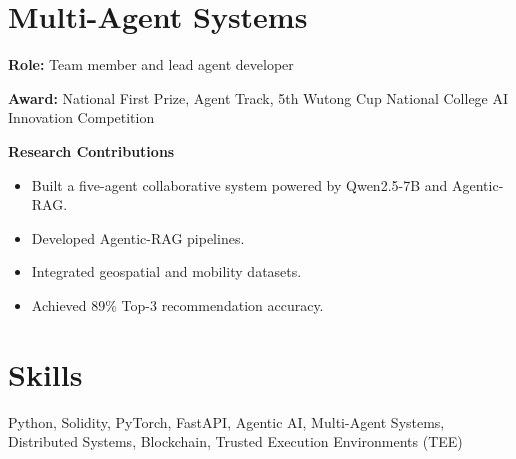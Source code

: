 \documentclass{resume}
\begin{document}
\section{Multi-Agent Systems}
\textbf{Role:} Team member and lead agent developer

\textbf{Award:} National First Prize, Agent Track, 5th Wutong Cup National College AI Innovation Competition

\textbf{Research Contributions}

\begin{itemize}
\item Built a five-agent collaborative system powered by Qwen2.5-7B and Agentic-RAG.
\item Developed Agentic-RAG pipelines.
\item Integrated geospatial and mobility datasets.
\item Achieved 89\% Top-3 recommendation accuracy.
\end{itemize}

\vspace{1pt}
\section{Skills}
Python, Solidity, PyTorch, FastAPI, Agentic AI, Multi-Agent Systems, Distributed Systems, Blockchain, Trusted Execution Environments (TEE)
\end{document}
